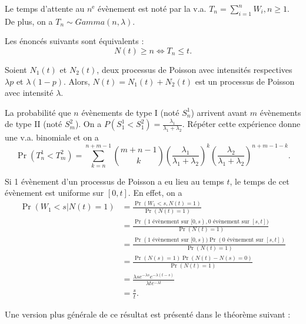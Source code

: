 \begin{definition}{}{}
	Le temps d'attente au $n^\text{e}$ évènement est noté par la v.a. $T_n = \sum_{i = 1}^{n}W_i, n\geq 1$. De plus, on a $T_n \sim Gamma(n, \lambda)$.
\end{definition}

Les énoncés suivants sont équivalents : 
$$N(t) \geq n \Leftrightarrow T_n \leq t.$$

\begin{propriete}{}{}
	Soient $N_1(t)$ et $N_2(t)$, deux processus de Poisson avec intensités respectives $\lambda p$ et $\lambda(1-p)$. Alors, $N(t) = N_1(t) + N_2(t)$ est un processus de Poisson avec intensité $\lambda$. 
\end{propriete}

La probabilité que $n$ évènements de type I (noté $S_n^1$) arrivent avant $m$ évènements de type II (noté $S_m^2$). On a $P(S_1^1 < S_1^2) = \frac{\lambda_1}{\lambda_1 + \lambda_2}$. Répéter cette expérience donne une v.a. binomiale et on a 
$$\Pr\left(T_n^1<T_m^2\right) = \sum_{k = n}^{n + m - 1} \binom{m + n - 1}{k} \left(\frac{\lambda_1}{\lambda_1 + \lambda_2}\right)^k \left(\frac{\lambda_2}{\lambda_1 + \lambda_2}\right)^{n+m-1-k}.$$

\begin{proposition}{}{}
	Si 1 évènement d'un processus de Poisson a eu lieu au temps $t$, le temps de cet évènement est uniforme sur $[0, t]$. En effet, on a 
	\begin{align*}
	\Pr(W_1 < s \vert N(t) = 1) &= \frac{\Pr(W_1 < s, N(t) = 1)}{\Pr(N(t) = 1)}\\
	&= \frac{\Pr(\text{1 évènement sur }[0, s), \text{0 évènement sur }[s, t])}{\Pr(N(t) = 1)}\\
	&= \frac{\Pr(\text{1 évènement sur }[0, s))\Pr(\text{0 évènement sur }[s, t])}{\Pr(N(t) = 1)}\\
	&= \frac{\Pr(N(s) = 1)\Pr(N(t) - N(s) = 0)}{\Pr(N(t) = 1)}\\
	&= \frac{\lambda s e^{-\lambda s} e^{-\lambda(t-s)}}{\lambda t e^{-\lambda t}}\\
	&= \frac{s}{t}.
	\end{align*}
\end{proposition}

Une version plus générale de ce résultat est présenté dans le théorème suivant : 

